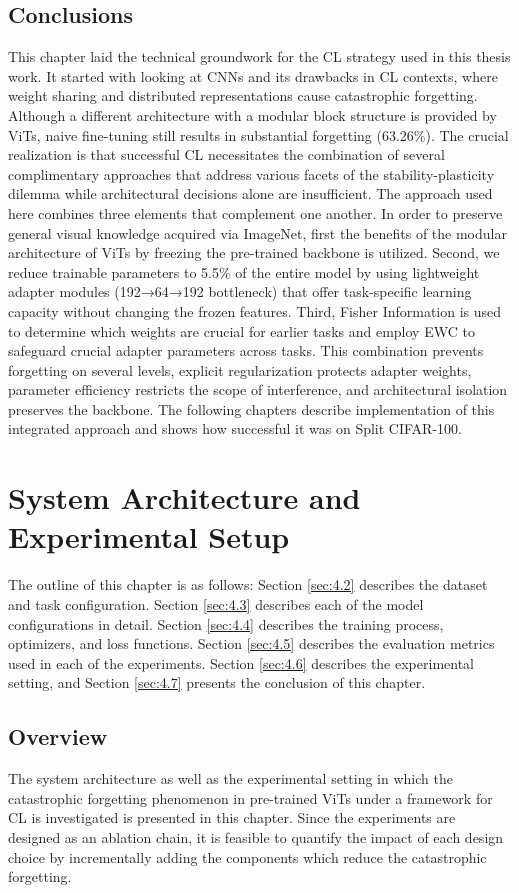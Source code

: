 \documentclass[english, LaM, oneside]{sapthesis}%
\numberwithin{equation}{chapter}
\begin{document}
\section{Conclusions}
\label{sec:3.6}
This chapter laid the technical groundwork for the CL strategy used in this thesis work. It started with looking at CNNs and its drawbacks in CL contexts, where weight sharing and distributed representations cause catastrophic forgetting. Although a different architecture with a modular block structure is provided by ViTs, naive fine-tuning still results in substantial forgetting (63.26\%). The crucial realization is that successful CL necessitates the combination of several complimentary approaches that address various facets of the stability-plasticity dilemma while architectural decisions alone are insufficient.
The approach used here combines three elements that complement one another. In order to preserve general visual knowledge acquired via ImageNet, first the benefits of the modular architecture of ViTs by freezing the pre-trained backbone is utilized. Second, we reduce trainable parameters to 5.5\% of the entire model by using lightweight adapter modules (192→64→192 bottleneck) that offer task-specific learning capacity without changing the frozen features. Third, Fisher Information is used to determine which weights are crucial for earlier tasks and employ EWC to safeguard crucial adapter parameters across tasks. This combination prevents forgetting on several levels, explicit regularization protects adapter weights, parameter efficiency restricts the scope of interference, and architectural isolation preserves the backbone. The following chapters describe implementation of this integrated approach and shows how successful it was on Split CIFAR-100.

\chapter{System Architecture and Experimental Setup}
\label{chap:4}
The outline of this chapter is as follows: Section \ref{sec:4.2} describes the dataset and task configuration. Section \ref{sec:4.3} describes each of the model configurations in detail. Section \ref{sec:4.4} describes the training process, optimizers, and loss functions. Section \ref{sec:4.5} describes the evaluation metrics used in each of the experiments. Section \ref{sec:4.6} describes the experimental setting, and Section \ref{sec:4.7} presents the conclusion of this chapter.
\section{Overview}
The system architecture as well as the experimental setting in which the catastrophic forgetting phenomenon in pre-trained ViTs under a framework for CL is investigated is presented in this chapter. Since the experiments are designed as an ablation chain, it is feasible to quantify the impact of each design choice by incrementally adding the components which reduce the catastrophic forgetting.
\end{document}
